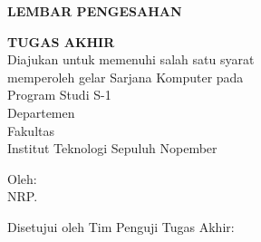 \begin{center}
  \large
  \textbf{LEMBAR PENGESAHAN}
\end{center}

\thispagestyle{empty}

\begin{center}
  \textbf{\tatitle{}}
\end{center}

\begingroup
\small

\begin{center}
  \textbf{TUGAS AKHIR}
  \\Diajukan untuk memenuhi salah satu syarat \\
  memperoleh gelar Sarjana Komputer pada \\
  Program Studi S-1 \studyprogram{} \\
  Departemen \department{} \\
  Fakultas \faculty{} \\
  Institut Teknologi Sepuluh Nopember
\end{center}

\begin{center}
  Oleh: \textbf{\name{}}
  \\NRP. \nrp{}
\end{center}

\begin{center}
  Disetujui oleh Tim Penguji Tugas Akhir:
\end{center}

\begingroup
\setlength{\tabcolsep}{0pt}


